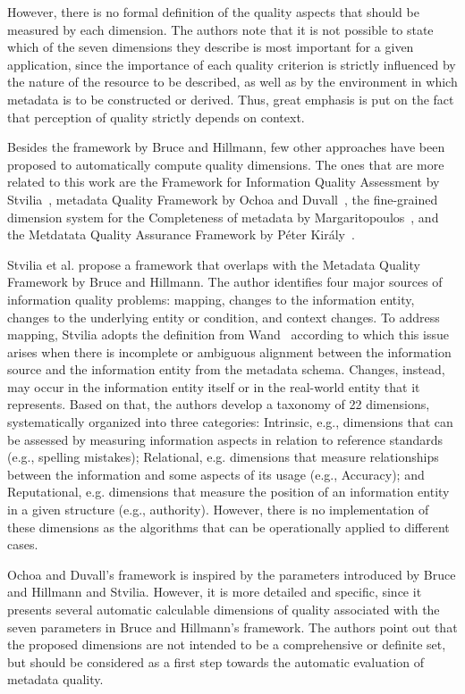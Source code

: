\documentclass[epsfig,a4paper,12pt,titlepage]{book}
\begin{document}
However, there is no formal definition of the quality aspects that should be measured by each dimension.
The authors note that it is not possible to state which of the seven dimensions they describe is most important for a given application, since the importance of each quality criterion is strictly influenced by the nature of the resource to be described, as well as by the environment in which metadata is to be constructed or derived. Thus, great emphasis is put on the fact that perception of quality strictly depends on context. 

Besides the framework by Bruce and Hillmann, few other approaches have been proposed to automatically compute quality dimensions. The ones that are more related to this work are the Framework for Information Quality Assessment by Stvilia~\cite{20}, metadata Quality Framework by Ochoa and Duvall~\cite{2}, the fine-grained dimension system for the Completeness of metadata by Margaritopoulos~\cite{margaritopoulos2009fine}, and the Metdatata Quality  Assurance Framework by P\'eter Kir{\'a}ly~\cite{3,7}. 

Stvilia et al. \cite{20} propose a framework that overlaps with the Metadata Quality Framework by Bruce and Hillmann. The author identifies four major sources of information quality problems: mapping, changes to the information entity, changes to the underlying entity or condition, and context changes. To address mapping, Stvilia adopts the definition from Wand~\cite{33} according to which this issue arises when there is incomplete or ambiguous alignment between the information source and the information entity from the metadata schema. Changes, instead, may occur in the information entity itself or in the real-world entity that it represents. Based on that, the authors develop a taxonomy of 22 dimensions, systematically organized into three categories: Intrinsic, e.g., dimensions that can be assessed by measuring information aspects in relation to reference standards (e.g., spelling mistakes); Relational, e.g.  dimensions that measure relationships between the information and some aspects of its usage (e.g., Accuracy); and Reputational, e.g.  dimensions that measure the position of an information entity in a given structure (e.g., authority). However, there is no implementation of these dimensions as the algorithms that can be operationally applied to different cases.

Ochoa and Duvall's framework \cite{2} is inspired by the parameters introduced by Bruce and Hillmann and Stvilia. However,  it is more detailed and specific, since it presents several  automatic calculable dimensions of quality associated with the seven parameters in Bruce and Hillmann's framework. 
The authors point out that the proposed dimensions are not intended to be a comprehensive or definite set, but should be considered as a first step towards the automatic evaluation of metadata quality.
		
\end{document}

